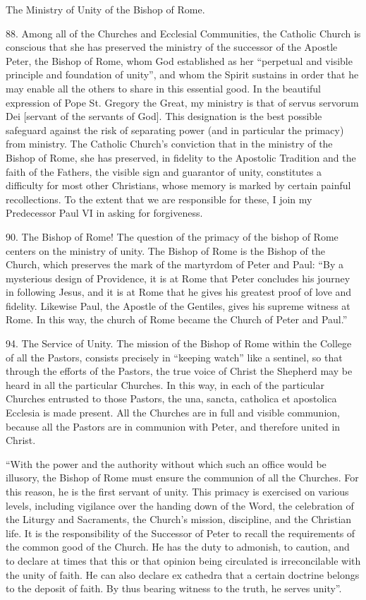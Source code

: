 \documentclass[oneside]{book}
\begin{document}
The Ministry of Unity of the Bishop of Rome.

88. Among all of the Churches and Ecclesial Communities, the Catholic Church is
conscious that she has preserved the ministry of the successor of the Apostle
Peter, the Bishop of Rome, whom God established as her ``perpetual and visible
principle and foundation of unity'', and whom the Spirit sustains in order that
he may enable all the others to share in this essential good. In the beautiful
expression of Pope St. Gregory the Great, my ministry is that of servus servorum
Dei [servant of the servants of God]. This designation is the best possible
safeguard against the risk of separating power (and in particular the primacy)
from ministry. The Catholic Church's conviction that in the ministry of the
Bishop of Rome, she has preserved, in fidelity to the Apostolic Tradition and
the faith of the Fathers, the visible sign and guarantor of unity, constitutes a
difficulty for most other Christians, whose memory is marked by certain painful
recollections. To the extent that we are responsible for these, I join my
Predecessor Paul VI in asking for forgiveness.

90. The Bishop of Rome! The question of the primacy of the bishop of Rome
centers on the ministry of unity. The Bishop of Rome is the Bishop of the
Church, which preserves the mark of the martyrdom of Peter and Paul: ``By a
mysterious design of Providence, it is at Rome that Peter concludes his journey
in following Jesus, and it is at Rome that he gives his greatest proof of love
and fidelity. Likewise Paul, the Apostle of the Gentiles, gives his supreme
witness at Rome. In this way, the church of Rome became the Church of Peter and
Paul.''

94. The Service of Unity. The mission of the Bishop of Rome within the College
of all the Pastors, consists precisely in ``keeping watch'' like a sentinel, so
that through the efforts of the Pastors, the true voice of Christ the Shepherd
may be heard in all the particular Churches. In this way, in each of the
particular Churches entrusted to those Pastors, the una, sancta, catholica et
apostolica Ecclesia is made present. All the Churches are in full and visible
communion, because all the Pastors are in communion with Peter, and therefore
united in Christ.

``With the power and the authority without which such an office would be
illusory, the Bishop of Rome must ensure the communion of all the Churches. For
this reason, he is the first servant of unity. This primacy is exercised on
various levels, including vigilance over the handing down of the Word, the
celebration of the Liturgy and Sacraments, the Church's mission, discipline, and
the Christian life. It is the responsibility of the Successor of Peter to recall
the requirements of the common good of the Church. He has the duty to admonish,
to caution, and to declare at times that this or that opinion being circulated
is irreconcilable with the unity of faith. He can also declare ex cathedra that
a certain doctrine belongs to the deposit of faith. By thus bearing witness to
the truth, he serves unity''.
\end{document}
